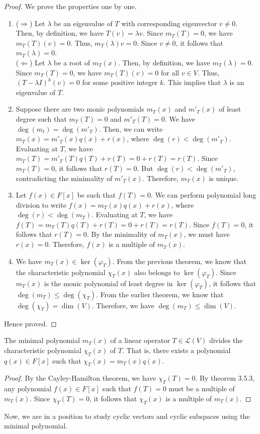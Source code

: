 \documentclass[openany]{book}
\begin{document}
\begin{proof}
    We prove the properties one by one.
    \begin{enumerate}
        \item ($\Rightarrow$) Let $\lambda$ be an eigenvalue of $T$ with corresponding eigenvector $v \neq 0$. Then, by definition, we have $T(v) = \lambda v$. Since $m_T(T) = 0$, we have $m_T(T)(v) = 0$. Thus, $m_T(\lambda)v = 0$. Since $v \neq 0$, it follows that $m_T(\lambda) = 0$. \\
        ($\Leftarrow$) Let $\lambda$ be a root of $m_T(x)$. Then, by definition, we have $m_T(\lambda) = 0$. Since $m_T(T) = 0$, we have $m_T(T)(v) = 0$ for all $v \in V$. Thus, $(T - \lambda I)^k(v) = 0$ for some positive integer $k$. This implies that $\lambda$ is an eigenvalue of $T$.
        \item Suppose there are two monic polynomials $m_T(x)$ and $m'_T(x)$ of least degree such that $m_T(T) = 0$ and $m'_T(T) = 0$. We have $\deg(m_t) = \deg(m'_T)$. Then, we can write $m_T(x) = m'_T(x)q(x) + r(x)$, where $\deg(r) < \deg(m'_T)$. Evaluating at $T$, we have $m_T(T) = m'_T(T)q(T) + r(T) = 0 + r(T) = r(T)$. Since $m_T(T) = 0$, it follows that $r(T) = 0$. But $\deg(r) < \deg(m'_T)$, contradicting the minimality of $m'_T(x)$. Therefore, $m_T(x)$ is unique.
        \item Let $f(x) \in F[x]$ be such that $f(T) = 0$. We can perform polynomial long division to write $f(x) = m_T(x)q(x) + r(x)$, where $\deg(r) < \deg(m_T)$. Evaluating at $T$, we have $f(T) = m_T(T)q(T) + r(T) = 0 + r(T) = r(T)$. Since $f(T) = 0$, it follows that $r(T) = 0$. By the minimality of $m_T(x)$, we must have $r(x) = 0$. Therefore, $f(x)$ is a multiple of $m_T(x)$.
        \item We have $m_T(x) \in \ker(\varphi_T)$. From the previous theorem, we know that the characteristic polynomial $\chi_T(x)$ also belongs to $\ker(\varphi_T)$. Since $m_T(x)$ is the monic polynomial of least degree in $\ker(\varphi_T)$, it follows that $\deg(m_T) \leq \deg(\chi_T)$. From the earlier theorem, we know that $\deg(\chi_T) = \dim(V)$. Therefore, we have $\deg(m_T) \leq \dim(V)$.
    \end{enumerate}
    Hence proved. 
\end{proof}
\begin{corollary}
The minimal polynomial $m_T(x)$ of a linear operator $T \in \mathcal{L}(V)$ divides the characteristic polynomial $\chi_T(x)$ of $T$. That is, there exists a polynomial $q(x) \in F[x]$ such that $\chi_T(x) = m_T(x)q(x)$.
\end{corollary}
\begin{proof}
    By the Cayley-Hamilton theorem, we have $\chi_T(T) = 0$. By theorem 3.5.3, any polynomial $f(x) \in F[x]$ such that $f(T) = 0$ must be a multiple of $m_T(x)$. Since $\chi_T(T) = 0$, it follows that $\chi_T(x)$ is a multiple of $m_T(x)$.
\end{proof}
Now, we are in a position to study cyclic vectors and cyclic subspaces using the minimal polynomial.
\end{document}
